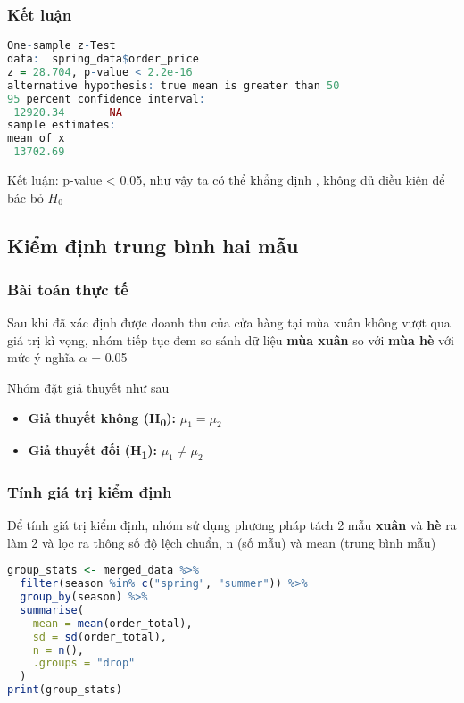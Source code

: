 \subsubsection{Kết luận}

\begin{lstlisting}[language=R, caption=Kết quả sau khi dùng t-test]
    One-sample z-Test
data:  spring_data$order_price
z = 28.704, p-value < 2.2e-16
alternative hypothesis: true mean is greater than 50
95 percent confidence interval:
 12920.34       NA
sample estimates:
mean of x 
 13702.69 
\end{lstlisting}

\begin{boxH}
    Kết luận: p-value < 0.05, như vậy ta có thể khẳng định , không đủ điều kiện để bác bỏ $H_0$
\end{boxH}


\subsection{Kiểm định trung bình hai mẫu}
\subsubsection{Bài toán thực tế}
Sau khi đã xác định được doanh thu của cửa hàng tại mùa xuân không vượt qua giá trị kì vọng, nhóm tiếp tục đem so sánh dữ liệu \textbf{mùa xuân}
so với \textbf{mùa hè} với mức ý nghĩa $\alpha$ = 0.05

Nhóm đặt giả thuyết như sau
\begin{itemize}
    \item \textbf{Giả thuyết không (H\textsubscript{0}):} $\mu_1 = \mu_2$ 
    \item \textbf{Giả thuyết đối (H\textsubscript{1}):} $\mu_1 \ne \mu_2$ 
\end{itemize}
\subsubsection{Tính giá trị kiểm định}
Để tính giá trị kiểm định, nhóm sử dụng phương pháp tách 2 mẫu \textbf{xuân} và \textbf{hè} ra làm 2 và lọc ra thông số độ lệch chuẩn, n (số mẫu) và mean (trung bình mẫu)

\begin{lstlisting}[language=R, caption=Chia nhóm và tính toán chỉ số đặc trưng ]
group_stats <- merged_data %>%
  filter(season %in% c("spring", "summer")) %>%
  group_by(season) %>%
  summarise(
    mean = mean(order_total),
    sd = sd(order_total),
    n = n(),
    .groups = "drop"
  )
print(group_stats)

\end{lstlisting}
